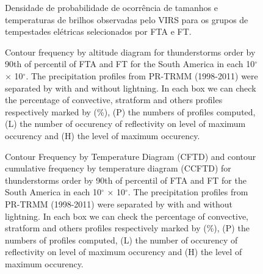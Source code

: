 \documentclass[preprint,authoryear,3p]{elsarticle}
\begin{document}
\begin{figure}
\caption{Densidade de probabilidade de ocorrência de tamanhos e temperaturas de brilhos observadas pelo VIRS para os grupos de tempestades elétricas selecionados por FTA e FT.}
\label{tam}
\end{figure}

\begin{figure}
  \caption{Contour frequency by altitude diagram for thunderstorms order by 90th of percentil of FTA and FT for the South America in each 10$^{\circ}$  $\times$ 10$^{\circ}$. The precipitation profiles from PR-TRMM (1998-2011) were separated by with and without lightning. In each box we can check the percentage of convective, stratform and others profiles respectively marked by (\%), (P) the numbers of profiles computed, (L) the number of occurency of reflectivity on level of maximum occurency and (H) the level of maximum occurency.}
\label{cfads}
\end{figure} 


\begin{figure}
  \caption{Contour Frequency by Temperature Diagram (CFTD) and contour cumulative frequency by temperature diagram (CCFTD) for thunderstorms order by 90th of percentil of FTA and FT for the South America in each 10$^{\circ}$  $\times$ 10$^{\circ}$. The precipitation profiles from PR-TRMM (1998-2011) were separated by with and without lightning. In each box we can check the percentage of convective, stratform and others profiles respectively marked by (\%), (P) the numbers of profiles computed, (L) the number of occurency of reflectivity on level of maximum occurency and (H) the level of maximum occurency.}
\label{cftdccftd}
\end{figure} 
\end{document}
